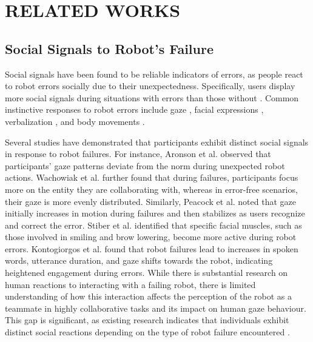 \section{RELATED WORKS}



 
\subsection{Social Signals to Robot's Failure}

 Social signals have been found to be reliable indicators of errors, as people react to robot errors socially due to their unexpectedness. Specifically, users display more social signals during situations with errors than those without \cite{stiber_using_2023}. Common instinctive responses to robot errors include gaze \cite{kontogiorgos_embodiment_2020, peacock_gaze_2022, kontogiorgos_systematic_2021}, facial expressions \cite{mirnig_impact_2015, stiber_modeling_2022, kontogiorgos_systematic_2021, wachowiak_time_2024}, verbalization \cite{kontogiorgos_embodiment_2020, mirnig_impact_2015, kontogiorgos_systematic_2021}, and body movements \cite{mirnig_impact_2015, trung_head_2017, wachowiak_time_2024}.



Several studies have demonstrated that participants exhibit distinct social signals in response to robot failures. For instance, Aronson et al. \cite{aronson_gaze_2018} observed that participants' gaze patterns deviate from the norm during unexpected robot actions. Wachowiak et al. \cite{wachowiak_analysing_2022} further found that during failures, participants focus more on the entity they are collaborating with, whereas in error-free scenarios, their gaze is more evenly distributed. Similarly, Peacock et al. \cite{peacock_gaze_2022} noted that gaze initially increases in motion during failures and then stabilizes as users recognize and correct the error. Stiber et al. \cite{stiber_using_2023} identified that specific facial muscles, such as those involved in smiling and brow lowering, become more active during robot errors. Kontogiorgos et al. \cite{kontogiorgos_systematic_2021, kontogiorgos_embodiment_2020} found that robot failures lead to increases in spoken words, utterance duration, and gaze shifts towards the robot, indicating heightened engagement during errors. While there is substantial research on human reactions to interacting with a failing robot, there is limited understanding of how this interaction affects the perception of the robot as a teammate in highly collaborative tasks and its impact on human gaze behaviour. This gap is significant, as existing research indicates that individuals exhibit distinct social reactions depending on the type of robot failure encountered \cite{mirnig_impact_2015, kontogiorgos_systematic_2021}.




